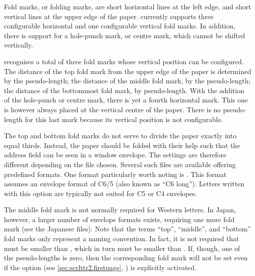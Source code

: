 Fold marks, or folding marks, are short horizontal lines at the left edge, and
short vertical lines at the upper edge of the paper. \KOMAScript{} currently
supports three configurable horizontal and one configurable vertical fold
marks. In addition, there is support for a hole-punch mark, or centre mark,
which cannot be shifted vertically.

\begin{Declaration}
\end{Declaration}
\KOMAScript{} recognises a total of three fold marks whose vertical position
can be configured. The distance of the top fold mark from the upper edge of
the paper is determined by the  pseudo-length; the
distance of the middle fold mark, by the
 pseudo-length; the
distance of the bottommost fold mark, by 
pseudo-length. With the addition of the hole-punch or
centre mark, there is yet a fourth
horizontal mark. This one is however always placed at the vertical centre of
the paper.
\iftrue%
There is no pseudo-length for this last mark because its vertical position is
not configurable.
\fi

The top and bottom fold marks do not serve to divide the
paper exactly into equal thirds. Instead, the paper should be folded with
their help such that the address field can be seen in a window envelope. The
settings are therefore different depending on the  file chosen.
Several such files are available offering predefined formats. One format
particularly worth noting is . This format assumes an
envelope format of C6/5 (also known as ``C6 long''). Letters written with this
option are typically not suited for C5 or C4 envelopes.

The middle fold mark is not normally required for Western letters. In Japan,
however, a larger number of envelope formats exists, requiring one more fold
mark (see the Japanese  files). Note that the terms ``top'',
``middle'', and ``bottom'' fold marks only represent a naming convention. In
fact, it is not required that  must be smaller than
, which in turn must be smaller than
. If, though, one of the pseudo-lengths is zero, then
the corresponding fold mark will not be set even if the
%
 option (see
\autoref{sec:scrlttr2.firstpage}, ) is
explicitly activated.
%
\EndIndexGroup


